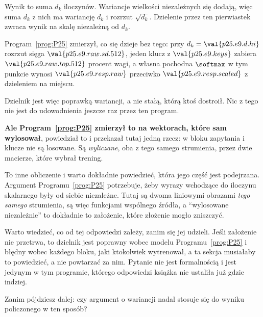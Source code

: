 \begin{fr}
\begin{ansblock}
Wynik to suma $d_k$ iloczynów. Wariancje wielkości niezależnych się dodają,
więc suma $d_k$ z nich ma wariancję $d_k$ i rozrzut $\sqrt{d_k}$. Dzielenie
przez ten pierwiastek zwraca wynik na skalę niezależną od $d_k$.
\end{ansblock}

Program~\ref{prog:P25} zmierzył, co się dzieje bez tego: przy
$d_k = \val{p25.e9.d.hi}$ rozrzut sięga $\val{p25.e9.raw.sd.512}$, jeden
klucz z $\val{p25.e9.keys}$ zabiera $\val{p25.e9.raw.top.512}$ procent wagi, a
własna pochodna $\softmax$ w tym punkcie wynosi $\val{p25.e9.resp.raw}$
przeciwko $\val{p25.e9.resp.scaled}$ z dzieleniem na miejscu.

Dzielnik jest więc poprawką wariancji, a nie stałą, którą ktoś dostroił. Nic
z tego nie jest do udowodnienia jeszcze raz przez ten program.

\textbf{Ale Program~\ref{prog:P25} zmierzył to na wektorach, które sam
wylosował}, powiedział to i przekazał tutaj jedną rzecz: w bloku zapytania i
klucze nie są losowane. Są \emph{wyliczane}, oba z tego samego strumienia,
przez dwie macierze, które wybrał trening.

To inne obliczenie i warto dokładnie powiedzieć, która jego część jest
podejrzana. Argument Programu~\ref{prog:P25} potrzebuje, żeby wyrazy
wchodzące do iloczynu skalarnego były od siebie niezależne. Tutaj są dwoma
liniowymi obrazami \emph{tego samego} strumienia, są więc funkcjami wspólnego
źródła, a \enquote{wylosowane niezależnie} to dokładnie to założenie, które
złożenie mogło zniszczyć.

Warto wiedzieć, co od tej odpowiedzi zależy, zanim się jej udzieli. Jeśli
założenie nie przetrwa, to dzielnik jest poprawny wobec modelu
Programu~\ref{prog:P25} i błędny wobec każdego bloku, jaki ktokolwiek
wytrenował, a ta sekcja musiałaby to powiedzieć, a nie powtarzać za nim.
Pytanie nie jest formalnością i jest jedynym w tym programie, którego
odpowiedzi książka nie ustaliła już gdzie indziej.

Zanim pójdziesz dalej: czy argument o wariancji nadal stosuje się do wyniku
policzonego w ten sposób?
\dotline
\nextframe
\end{fr}


